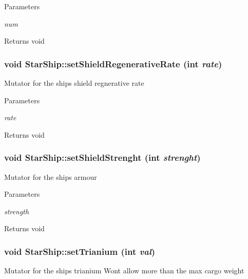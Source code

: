 \begin{DoxyParams}{Parameters}
\item[{\em num}]\end{DoxyParams}
\begin{DoxyReturn}{Returns}
void 
\end{DoxyReturn}
\hypertarget{classStarShip_a9b41a780259b41ebec4b69de12ecc276}{
\subsubsection[{setShieldRegenerativeRate}]{\setlength{\rightskip}{0pt plus 5cm}void StarShip::setShieldRegenerativeRate (int {\em rate})}}
\label{da/d97/classStarShip_a9b41a780259b41ebec4b69de12ecc276}
Mutator for the ships shield regnerative rate


\begin{DoxyParams}{Parameters}
\item[{\em rate}]\end{DoxyParams}
\begin{DoxyReturn}{Returns}
void 
\end{DoxyReturn}
\hypertarget{classStarShip_abe926e5606f91d6ec80b6779fee16e39}{
\subsubsection[{setShieldStrenght}]{\setlength{\rightskip}{0pt plus 5cm}void StarShip::setShieldStrenght (int {\em strenght})}}
\label{da/d97/classStarShip_abe926e5606f91d6ec80b6779fee16e39}
Mutator for the ships armour


\begin{DoxyParams}{Parameters}
\item[{\em strength}]\end{DoxyParams}
\begin{DoxyReturn}{Returns}
void 
\end{DoxyReturn}
\hypertarget{classStarShip_a77b32c7f2290cafd2827b868c962d6e9}{
\subsubsection[{setTrianium}]{\setlength{\rightskip}{0pt plus 5cm}void StarShip::setTrianium (int {\em val})}}
\label{da/d97/classStarShip_a77b32c7f2290cafd2827b868c962d6e9}
Mutator for the ships trianium Wont allow more than the max cargo weight


